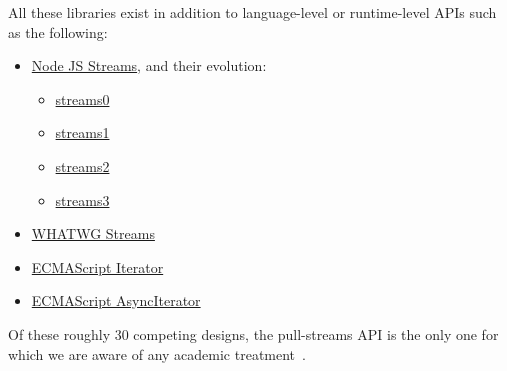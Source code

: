 \documentclass[sigplan,screen,10pt,review]{acmart}
\begin{document}
All these libraries exist in addition to language-level or runtime-level APIs such as the following:

\begin{itemize}
    \item \href{https://nodejs.org/api/stream.html}{Node JS Streams}, and their evolution: \begin{itemize}
        \item \href{https://nodejs.org/docs/v0.1.100/api.html}{streams0}
        \item \href{https://nodejs.org/docs/v0.4.0/api/streams.html}{streams1}
        \item \href{https://nodejs.org/docs/v0.10.0/api/stream.html}{streams2}
        \item \href{https://nodejs.org/docs/v0.11.5/api/stream.html}{streams3}
    \end{itemize}
    \item \href{https://streams.spec.whatwg.org/}{WHATWG Streams}
    \item \href{https://tc39.es/ecma262/multipage/control-abstraction-objects.html#sec-%iteratorprototype%-object}{ECMAScript Iterator}
    \item \href{https://tc39.es/ecma262/multipage/control-abstraction-objects.html#sec-asynciteratorprototype}{ECMAScript AsyncIterator}
\end{itemize}

Of these roughly 30 competing designs, the pull-streams API is the only one for which we are aware of any academic treatment~\cite{lavoie2018formalization}.
\end{document}
